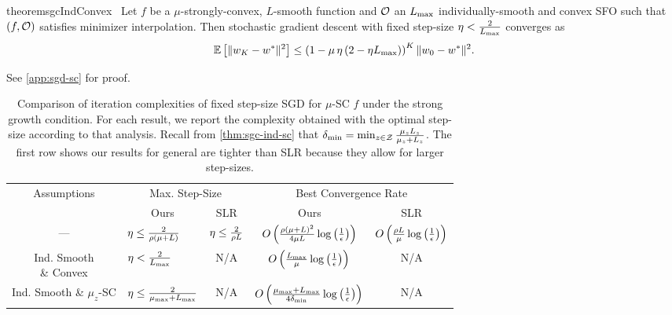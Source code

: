 \begin{restatable}{theorem}{sgcIndConvex}~\label{thm:sgc-ind-convex}
    Let \( f \) be a \( \mu \)-strongly-convex, \( L \)-smooth function and \( \oracle{} \) an \( \Lmax \) individually-smooth and convex \ac{SFO} such that \( \rbr{f, \oracle{}} \) satisfies minimizer interpolation.
    Then stochastic gradient descent with fixed step-size \( \eta < \frac{2}{\Lmax} \) converges as
    \[ \E\sbr{\norm{\w_{K} - \wopt}^2} \leq \rbr{1 - \mu \, \eta \rbr{2 - \eta \Lmax}}^K \norm{\w_0 - \wopt}^2. \]
\end{restatable}
\noindent See \autoref{app:sgd-sc} for proof.\hfill \break

\begin{table}[t]
    \centering
    \begin{tabular}{c l l c c  }\toprule
        \multirow{2}{*}{Assumptions} & \multicolumn{2}{c}{Max. Step-Size}  & \multicolumn{2}{c}{Best Convergence Rate}\\%
        \cmidrule(lr){2-3} \cmidrule(l){4-5}
                 & \multicolumn{1}{c}{Ours} & \multicolumn{1}{c}{SLR} & \multicolumn{1}{c}{Ours} & \multicolumn{1}{c}{SLR}\\ \midrule
     — & \( \eta \leq \frac{2}{\sgc\rbr{\mu + L}} \)%
                 & \( \eta \leq \frac{2}{\sgc L} \)%
                 & \( O\rbr{\frac{\rho{(\mu + L)}^2}{4\mu L} \log\rbr{\inv{\epsilon}}} \)%
                 & \( O\rbr{\frac{\rho L}{\mu} \log\rbr{\inv{\epsilon}}} \) \\ \addlinespace
    \makecell{Ind. Smooth \\ \& Convex}%
                 & \( \eta < \frac{2}{\Lmax} \)%
                 & \multicolumn{1}{c}{N/A}%
                 & \( O\rbr{\frac{\Lmax}{\mu}\log\rbr{\inv{\epsilon}}} \)%
                 & \multicolumn{1}{c}{N/A}\\ \addlinespace 
    \makecell{Ind. Smooth \\ \& \(\mu_z\)-SC}%
                 & \( \eta \leq \frac{2}{\mumax + \Lmax} \)%
                 & \multicolumn{1}{c}{N/A}%
                 & \( O\rbr{\frac{\mumax + \Lmax}{4 \delta_{\text{min}}} \log\rbr{\frac{1}{\epsilon}}} \)%
                 & \multicolumn{1}{c}{N/A} \\ \bottomrule 
    \end{tabular}
    \caption{Comparison of iteration complexities of fixed step-size \ac{SGD} for \( \mu \)-SC \( f \) under the strong growth condition. For each result, we report the complexity obtained with the optimal step-size according to that analysis. Recall from \autoref{thm:sgc-ind-sc} that \( \delta_{\text{min}} = \min_{\z \in \calZ} \frac{\mu_\z L_\z}{\mu_\z + L_\z} \). The first row shows our results for general \oracle{} are tighter than SLR \citep{schmidt2013fast} because they allow for larger step-sizes.}%
    \label{table:sgd-sc-comparison}
\end{table}

